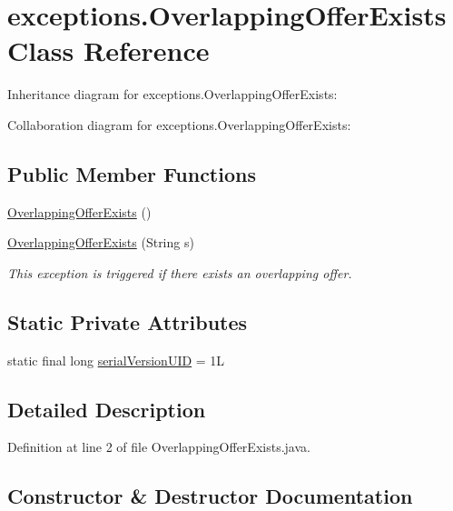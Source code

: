 \hypertarget{classexceptions_1_1OverlappingOfferExists}{}\section{exceptions.\+Overlapping\+Offer\+Exists Class Reference}
\label{classexceptions_1_1OverlappingOfferExists}


Inheritance diagram for exceptions.\+Overlapping\+Offer\+Exists\+:


Collaboration diagram for exceptions.\+Overlapping\+Offer\+Exists\+:
\subsection*{Public Member Functions}
\begin{DoxyCompactItemize}
\item 
\mbox{\hyperlink{classexceptions_1_1OverlappingOfferExists_a1ba2d73acc9428e642786973e8b2b6b3}{Overlapping\+Offer\+Exists}} ()
\item 
\mbox{\hyperlink{classexceptions_1_1OverlappingOfferExists_a053baab9b6c9e1da073098c4cfbcdc45}{Overlapping\+Offer\+Exists}} (String s)
\begin{DoxyCompactList}\small\item\em This exception is triggered if there exists an overlapping offer. \end{DoxyCompactList}\end{DoxyCompactItemize}
\subsection*{Static Private Attributes}
\begin{DoxyCompactItemize}
\item 
static final long \mbox{\hyperlink{classexceptions_1_1OverlappingOfferExists_ab47bd08f41ac7a43204806e53aa1538a}{serial\+Version\+U\+ID}} = 1L
\end{DoxyCompactItemize}


\subsection{Detailed Description}


Definition at line 2 of file Overlapping\+Offer\+Exists.\+java.



\subsection{Constructor \& Destructor Documentation}
\mbox{\label{classexceptions_1_1OverlappingOfferExists_a1ba2d73acc9428e642786973e8b2b6b3}} 
